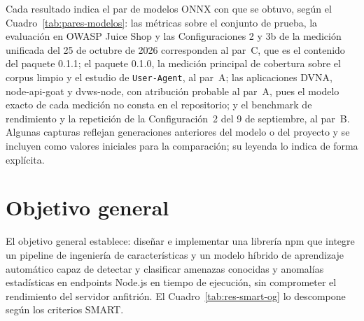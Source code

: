 Cada resultado indica el par de modelos ONNX con que se obtuvo, según el
Cuadro~\ref{tab:pares-modelos}: las métricas sobre el conjunto de prueba, la evaluación en OWASP
Juice Shop y las Configuraciones 2 y 3b de la medición unificada del 25 de octubre de 2026
corresponden al par~C, que es el contenido del paquete 0.1.1; el paquete 0.1.0, la
medición principal de cobertura sobre el corpus limpio y el estudio de \texttt{User-Agent}, al
par~A; las aplicaciones DVNA, node-api-goat y
dvws-node, con atribución probable al par~A, pues el modelo exacto de cada medición no consta en el
repositorio; y el benchmark de rendimiento y la repetición de la Configuración~2 del 9 de
septiembre, al par~B. Algunas
capturas reflejan generaciones anteriores del modelo o del proyecto y se incluyen como valores
iniciales para la comparación; su leyenda lo indica de forma explícita.

\section{Objetivo general}
\label{sec:res-og}

El objetivo general establece: diseñar e implementar una librería npm que integre un pipeline de
ingeniería de características y un modelo híbrido de aprendizaje automático capaz de detectar y
clasificar amenazas conocidas y anomalías estadísticas en endpoints Node.js en tiempo de
ejecución, sin comprometer el rendimiento del servidor anfitrión. El Cuadro~\ref{tab:res-smart-og}
lo descompone según los criterios SMART.


